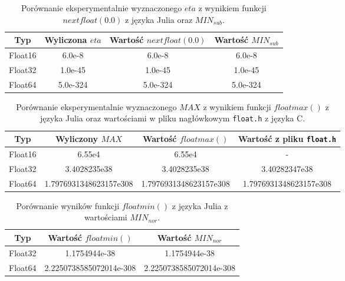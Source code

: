\documentclass{article}
\begin{document}
\begin{table}[H]
\begin{adjustbox}{center}
\begin{tabular}{|c|c|c|c|}
    \hline
    Typ & Wyliczona $eta$ & Wartość $nextfloat(0.0)$ & Wartość $MIN_{sub}$\\
    \hline
    Float16 & 6.0e-8 & 6.0e-8 & 6.0e-8\\
    \hline
    Float32 & 1.0e-45 & 1.0e-45 & 1.0e-45\\
    \hline
    Float64 & 5.0e-324 & 5.0e-324 & 5.0e-324\\
    \hline
\end{tabular}
\end{adjustbox}
\caption{Porównanie eksperymentalnie wyznaczonego $eta$ z wynikiem funkcji $nextfloat(0.0)$ z języka Julia oraz $MIN_{sub}$.}
\end{table}

\begin{table}[H]
\begin{adjustbox}{center}
\begin{tabular}{|c|c|c|c|}
    \hline
    Typ & Wyliczony $MAX$ & Wartość $floatmax()$ & Wartość z pliku \texttt{float.h}\\
    \hline
    Float16 & 6.55e4 & 6.55e4 & -\\
    \hline
    Float32 & 3.4028235e38 & 3.4028235e38 & 3.40282347e38\\
    \hline
    Float64 & 1.7976931348623157e308 & 1.7976931348623157e308 & 1.7976931348623157e308\\
    \hline
\end{tabular}
\end{adjustbox}
\caption{Porównanie eksperymentalnie wyznaczonego $MAX$ z wynikiem funkcji $floatmax()$ z języka Julia oraz wartościami w pliku nagłówkowym \texttt{float.h} z języka C.}
\end{table}

\begin{table}[H]
\begin{adjustbox}{center}
\begin{tabular}{|c|c|c|}
    \hline
    Typ & Wartość $floatmin()$ & Wartość $MIN_{nor}$\\
    \hline
    Float32 & 1.1754944e-38 & 1.1754944e-38\\
    \hline
    Float64 & 2.2250738585072014e-308 & 2.2250738585072014e-308\\
    \hline
\end{tabular}
\end{adjustbox}
\caption{Porównanie wyników funkcji $floatmin()$ z języka Julia z wartościami $MIN_{nor}$.}
\end{table}
\end{document}

